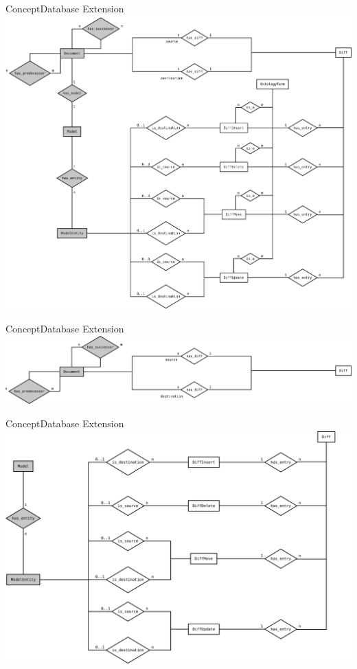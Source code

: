 \begin{frame}{Concept}{Database Extension}
	\centering
	\includegraphics[width=\linewidth,height=\textheight,keepaspectratio]{../tex/resources/db-concept-er.pdf}
\end{frame}

\begin{frame}{Concept}{Database Extension}
	\centering
	\includegraphics[width=\linewidth,height=\textheight,keepaspectratio]{figures/er-part-1.pdf}
\end{frame}

\begin{frame}{Concept}{Database Extension}
	\centering
	\includegraphics[width=\linewidth,height=\textheight,keepaspectratio]{figures/er-part-2.pdf}
\end{frame}


